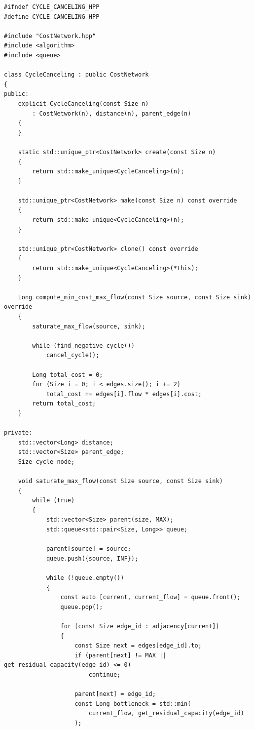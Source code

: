 \newpage
\label{ap:cycle_canceling}

\begin{lstlisting}[caption={Implementação em C++ do algoritmo \textit{Cycle Canceling}.}, label={lst:cycle_canceling}]
#ifndef CYCLE_CANCELING_HPP
#define CYCLE_CANCELING_HPP

#include "CostNetwork.hpp"
#include <algorithm>
#include <queue>

class CycleCanceling : public CostNetwork
{
public:
	explicit CycleCanceling(const Size n)
	    : CostNetwork(n), distance(n), parent_edge(n)
	{
	}

	static std::unique_ptr<CostNetwork> create(const Size n)
	{
		return std::make_unique<CycleCanceling>(n);
	}

	std::unique_ptr<CostNetwork> make(const Size n) const override
	{
		return std::make_unique<CycleCanceling>(n);
	}

	std::unique_ptr<CostNetwork> clone() const override
	{
		return std::make_unique<CycleCanceling>(*this);
	}

	Long compute_min_cost_max_flow(const Size source, const Size sink) override
	{
		saturate_max_flow(source, sink);

		while (find_negative_cycle())
			cancel_cycle();

		Long total_cost = 0;
		for (Size i = 0; i < edges.size(); i += 2)
			total_cost += edges[i].flow * edges[i].cost;
		return total_cost;
	}

private:
	std::vector<Long> distance;
	std::vector<Size> parent_edge;
	Size cycle_node;

	void saturate_max_flow(const Size source, const Size sink)
	{
		while (true)
		{
			std::vector<Size> parent(size, MAX);
			std::queue<std::pair<Size, Long>> queue;

			parent[source] = source;
			queue.push({source, INF});

			while (!queue.empty())
			{
				const auto [current, current_flow] = queue.front();
				queue.pop();

				for (const Size edge_id : adjacency[current])
				{
					const Size next = edges[edge_id].to;
					if (parent[next] != MAX || get_residual_capacity(edge_id) <= 0)
						continue;

					parent[next] = edge_id;
					const Long bottleneck = std::min(
					    current_flow, get_residual_capacity(edge_id)
					);


\end{lstlisting}
